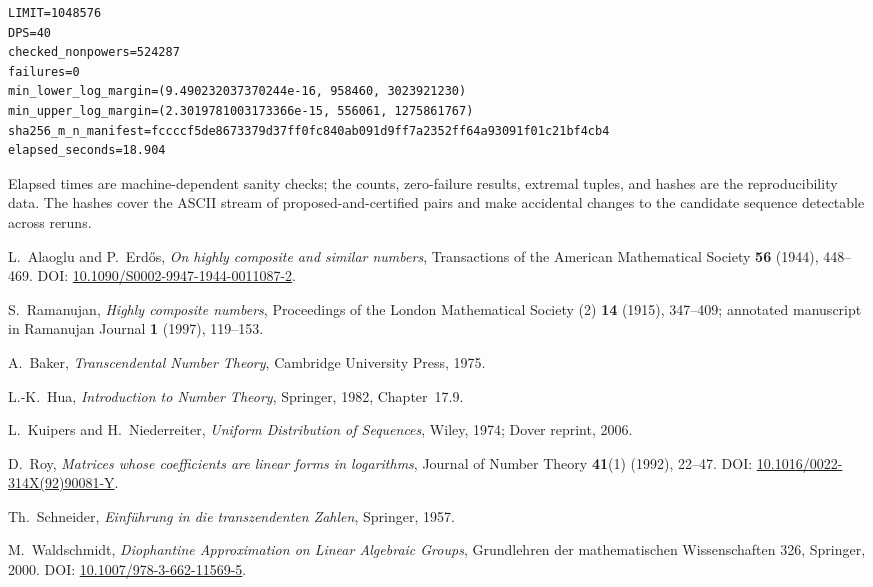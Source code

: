 \documentclass[11pt,oneside]{article}
\theoremstyle{definition}
\theoremstyle{remark}
\newcommand{\lean}[1]{\texttt{\detokenize{#1}}}
\begin{document}
\begin{lstlisting}[style=pythonstyle,numbers=none,caption={Upper half output.}]
LIMIT=1048576
DPS=40
checked_nonpowers=524287
failures=0
min_lower_log_margin=(9.490232037370244e-16, 958460, 3023921230)
min_upper_log_margin=(2.3019781003173366e-15, 556061, 1275861767)
sha256_m_n_manifest=fccccf5de8673379d37ff0fc840ab091d9ff7a2352ff64a93091f01c21bf4cb4
elapsed_seconds=18.904
\end{lstlisting}

Elapsed times are machine-dependent sanity checks; the counts, zero-failure results,
extremal tuples, and hashes are the reproducibility data.  The hashes cover the ASCII stream
\lean{m:n;} of proposed-and-certified pairs and make accidental changes to the candidate
sequence detectable across reruns.

\begin{thebibliography}{99}

L.~Alaoglu and P.~Erd\H{o}s,
\newblock \emph{On highly composite and similar numbers},
\newblock Transactions of the American Mathematical Society \textbf{56} (1944), 448--469.
\newblock DOI: \href{https://doi.org/10.1090/S0002-9947-1944-0011087-2}{10.1090/S0002-9947-1944-0011087-2}.

S.~Ramanujan,
\newblock \emph{Highly composite numbers},
\newblock Proceedings of the London Mathematical Society (2) \textbf{14} (1915), 347--409;
annotated manuscript in Ramanujan Journal \textbf{1} (1997), 119--153.

A.~Baker,
\newblock \emph{Transcendental Number Theory},
\newblock Cambridge University Press, 1975.

L.-K.~Hua,
\newblock \emph{Introduction to Number Theory},
\newblock Springer, 1982, Chapter~17.9.

L.~Kuipers and H.~Niederreiter,
\newblock \emph{Uniform Distribution of Sequences},
\newblock Wiley, 1974; Dover reprint, 2006.

D.~Roy,
\newblock \emph{Matrices whose coefficients are linear forms in logarithms},
\newblock Journal of Number Theory \textbf{41}(1) (1992), 22--47.
\newblock DOI: \href{https://doi.org/10.1016/0022-314X(92)90081-Y}{10.1016/0022-314X(92)90081-Y}.

Th.~Schneider,
\newblock \emph{Einf\"uhrung in die transzendenten Zahlen},
\newblock Springer, 1957.

M.~Waldschmidt,
\newblock \emph{Diophantine Approximation on Linear Algebraic Groups},
\newblock Grundlehren der mathematischen Wissenschaften 326, Springer, 2000.
\newblock DOI: \href{https://doi.org/10.1007/978-3-662-11569-5}{10.1007/978-3-662-11569-5}.


\end{thebibliography}
\end{document}
